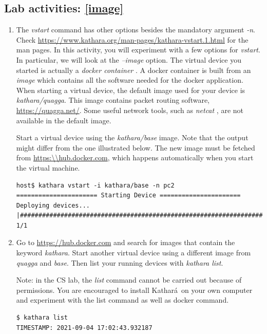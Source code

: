 \documentclass[12pt]{book}
\newcommand{\kathara}{Kathar\'a}
\begin{document}
\begin{enumerate}[label=\arabic*.]
\section{Lab activities: \ref{image}}

\begin{enumerate}[resume*]
\item The \emph{vstart} command has other options besides the mandatory argument \emph{-n}. Check \url{https://www.kathara.org/man-pages/kathara-vstart.1.html} for the man pages. In this activity, you will experiment with a few options for \emph{vstart}. In particular, we will look at the \emph{--image} option. The virtual device you started is actually a \emph{docker container} \cite{docker-useful}. A docker container is built from an \emph{image} which contains all the software needed for the docker application. When starting a virtual device, the default image used for your device is \emph{kathara/quagga}. This image contains packet routing software, \url{https://quagga.net/}. Some useful network tools, such as \emph{netcat} \cite{netcat}, are not available in the default image.

  Start a virtual device using the \emph{kathara/base} image. Note that the output might differ from the one illustrated below. The new image must be fetched from \url{https:\\hub.docker.com}, which happens automatically when you start the virtual machine.

\begin{lstlisting}
host$ kathara vstart -i kathara/base -n pc2
====================== Starting Device ======================
Deploying devices... |#######################################################################################| 1/1
\end{lstlisting}

\item Go to \url{https://hub.docker.com} and search for images that contain the keyword \emph{kathara}. Start another virtual device using a different image from \emph{quagga} and \emph{base}. Then list your running devices with \emph{kathara list}.

  Note: in the CS lab, the \emph{list} command cannot be carried out because of permissions. You are encouraged to install \kathara\ on your own computer and experiment with the list command as well as docker command.

\begin{lstlisting}
$ kathara list
TIMESTAMP: 2021-09-04 17:02:43.932187



\end{lstlisting}
\end{enumerate}
\end{enumerate}
\end{document}
